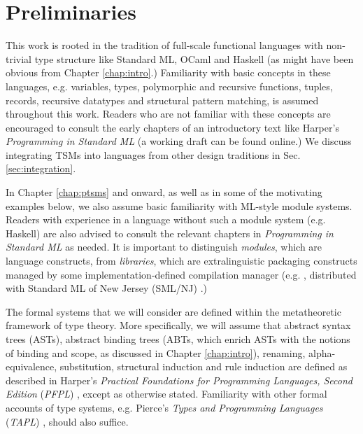 
\section{Preliminaries}\label{sec:preliminaries}
\vspace{-3px}
This work is rooted in the tradition of full-scale functional languages with non-trivial type structure like Standard ML, OCaml and Haskell (as might have been obvious from Chapter \ref{chap:intro}.) Familiarity with basic concepts in these languages, e.g. variables, types, polymorphic and recursive functions, tuples, records, recursive datatypes and structural pattern matching, is assumed throughout this work. Readers who are not familiar with these concepts are encouraged to consult the early chapters of an introductory text like Harper's \emph{Programming in Standard ML} \cite{harper1997programming} (a working draft can be found online.) We discuss integrating TSMs into languages from other design traditions in Sec. \ref{sec:integration}.

In Chapter \ref{chap:ptsms} and onward, as well as in some of the motivating examples below, we also assume basic familiarity with ML-style module systems. Readers with experience in a language without such a module system (e.g. Haskell) are also advised to consult the relevant chapters in \emph{Programming in Standard ML} \cite{harper1997programming} as needed. It is important to  distinguish \emph{modules}, which are language constructs, from \emph{libraries}, which are extralinguistic packaging constructs managed by some implementation-defined compilation manager (e.g. , distributed with Standard ML of New Jersey (SML/NJ) \cite{DBLP:conf/plilp/AppelM91}.)

The formal systems that we will consider are defined within the metatheoretic framework of type theory. More specifically, we will assume that abstract syntax trees (ASTs), abstract binding trees (ABTs, which enrich ASTs with the notions of binding and scope, as discussed in Chapter \ref{chap:intro}), renaming, alpha-equivalence, substitution, structural induction and rule induction are defined as described in Harper's \emph{Practical Foundations for Programming Languages, Second Edition} (\emph{PFPL}) \cite{pfpl}, except as otherwise stated. Familiarity with other formal accounts of type systems, e.g. Pierce's \emph{Types and Programming Languages} (\emph{TAPL}) \cite{tapl}, should also suffice.%

